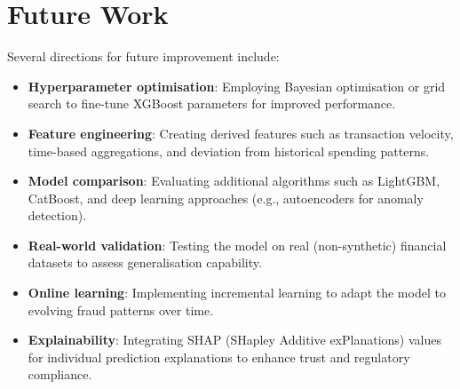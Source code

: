 \documentclass[12pt,a4paper]{report}
\begin{document}
\section{Future Work}

Several directions for future improvement include:

\begin{itemize}
    \item \textbf{Hyperparameter optimisation}: Employing Bayesian optimisation or grid search to fine-tune XGBoost parameters for improved performance.
    \item \textbf{Feature engineering}: Creating derived features such as transaction velocity, time-based aggregations, and deviation from historical spending patterns.
    \item \textbf{Model comparison}: Evaluating additional algorithms such as LightGBM, CatBoost, and deep learning approaches (e.g., autoencoders for anomaly detection).
    \item \textbf{Real-world validation}: Testing the model on real (non-synthetic) financial datasets to assess generalisation capability.
    \item \textbf{Online learning}: Implementing incremental learning to adapt the model to evolving fraud patterns over time.
    \item \textbf{Explainability}: Integrating SHAP (SHapley Additive exPlanations) values for individual prediction explanations to enhance trust and regulatory compliance.
\end{itemize}

\clearpage
{}
\end{document}
